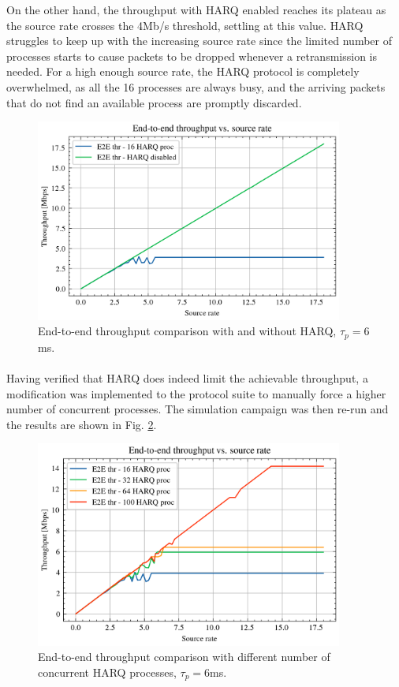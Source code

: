 On the other hand, the throughput with \ac{HARQ} enabled reaches its plateau as the source rate crosses the 4Mb/s threshold, settling at this value. \ac{HARQ} struggles to keep up with the increasing source rate since the limited number of processes starts to cause packets to be dropped whenever a retransmission is needed. For a high enough source rate, the \ac{HARQ} protocol is completely overwhelmed, as all the 16 processes are always busy, and the arriving packets that do not find an available process are promptly discarded.


\begin{figure}[ht]
    \centering
    \includegraphics[width=0.9\textwidth]{res/harq-onoff2.png}
    \caption{End-to-end throughput comparison with and without \ac{HARQ}, $\tau_p=6$ms.}
    \label{fig:harq_on_off}
\end{figure}

\paragraph{}
Having verified that \ac{HARQ} does indeed limit the achievable throughput, a modification was implemented to the protocol suite to manually force a higher number of concurrent processes. The simulation campaign was then re-run and the results are shown in Fig. \ref{fig:harq-numproc}.

\begin{figure}[ht]
    \centering
    \includegraphics[width=0.9\textwidth]{res/harq_numproc_new.png}
    \caption{End-to-end throughput comparison with different number of concurrent \ac{HARQ} processes, $\tau_p=6$ms.}
    \label{fig:harq-numproc}
\end{figure}

